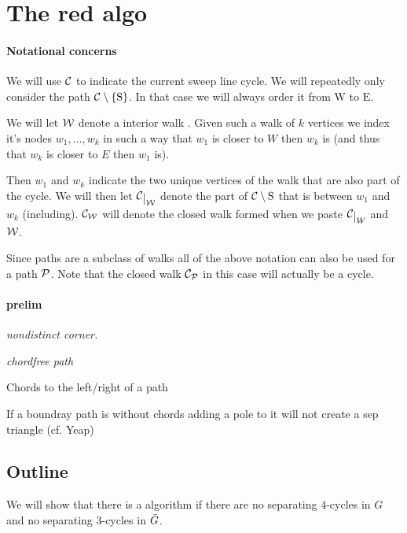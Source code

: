 \newcommand{\mrN}{\mathrm{N}}
\newcommand{\mrS}{\mathrm{S}}
\newcommand{\mrE}{\mathrm{E}}
\newcommand{\mrW}{\mathrm{W}}


\section{The red algo}
\paragraph{Notational concerns}
We will use $\C$ to indicate the current sweep line cycle. 
We will repeatedly only consider the path $\cpath$. In that case we will always order it from $\mrW$ to $\mrE$. 

We will let $\W$ denote a interior walk  . Given such a walk of $k$ vertices we index it's nodes $w_1, \ldots, w_k$  in such a way that $w_1$ is closer to $W$ then $w_k$ is (and thus that $w_k$ is closer to $E$ then $w_1$ is). 

Then $w_1$ and $w_k$ indicate the two unique vertices of the walk that are also part of the cycle. We will then let $\restC{\W}$ denote the part of $\C\setminus {\mathrm{S}}$ that is between $w_1$ and $w_k$ (including). $\C_\W$ will denote the closed walk formed when we paste $\restC{W}$ and $\W$.

Since paths are a subclass of walks all of the above notation can also be used for a path $\P$. Note that the closed walk $\C_\P$ in this case will actually be a cycle.


\paragraph{prelim}
\emph{nondistinct corner.}

\emph{chordfree path}

Chords to the left/right of a path

\begin{lemma}
If a boundray path is without chords adding a pole to it will not create a sep triangle (cf. Yeap)
\end{lemma}

\subsection{Outline}
We will show that there is a algorithm if there are no separating $4$-cycles in $G$ and no separating $3$-cycles in $\ext G$.

